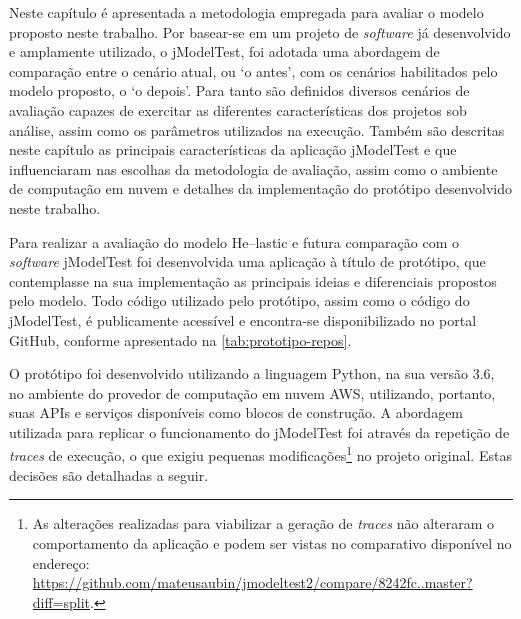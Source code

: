 \documentclass[english,brazilian]{UNISINOSmonografia} %
\begin{document}



Neste capítulo é apresentada a metodologia empregada para avaliar o modelo proposto neste trabalho.
%
Por basear-se em um projeto de \textit{software} já desenvolvido e amplamente utilizado, o jModelTest, foi adotada uma abordagem de comparação entre o cenário atual, ou \textquoteleft o antes\textquoteright, com os cenários habilitados pelo modelo proposto, o \textquoteleft o depois\textquoteright.
%
Para tanto são definidos diversos cenários de avaliação capazes de exercitar as diferentes características dos projetos sob análise, assim como os parâmetros utilizados na execução.
%
Também são descritas neste capítulo as principais características da aplicação jModelTest e que influenciaram nas escolhas da metodologia de avaliação, assim como o ambiente de computação em nuvem e detalhes da implementação do protótipo desenvolvido neste trabalho.



Para realizar a avaliação do modelo \textsf{He}--lastic e futura comparação com o \textit{software} jModelTest foi desenvolvida uma aplicação à título de protótipo, que contemplasse na sua implementação as principais ideias e diferenciais propostos pelo modelo.
Todo código utilizado pelo protótipo, assim como o código do jModelTest, é publicamente acessível e encontra-se disponibilizado no portal GitHub, conforme apresentado na \autoref{tab:prototipo-repos}.


O protótipo foi desenvolvido utilizando a linguagem Python, na sua versão 3.6, no ambiente do provedor de computação em nuvem AWS, utilizando, portanto, suas APIs e serviços disponíveis como blocos de construção.
A abordagem utilizada para replicar o funcionamento do jModelTest foi através da repetição de \textit{traces} de execução, o que exigiu pequenas modificações\footnote{
	As alterações realizadas para viabilizar a geração de \textit{traces} não alteraram o comportamento da aplicação e podem ser vistas no comparativo disponível no endereço: \url{https://github.com/mateusaubin/jmodeltest2/compare/8242fc..master?diff=split}.
} no projeto original.
Estas decisões são detalhadas a seguir.
\end{document}
